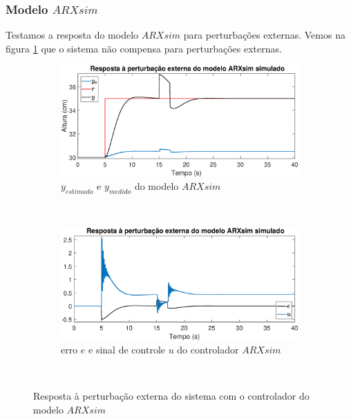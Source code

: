 \subsubsection{Modelo $ARXsim$}

Testamos a resposta do modelo $ARXsim$ para perturbações externas. Vemos na figura \ref{fig:pextsarxsimy} que o sistema não compensa para perturbações externas.

\begin{figure}[htb]
	\centering
	\begin{subfigure}[t]{0.48\textwidth}
		\includegraphics[width=1\linewidth]{pasta1_figuras/pextsarxsimy}
		\caption[$y_{estimado}$ e $y_{medido}$ do modelo $ARX2$]{$y_{estimado}$ e $y_{medido}$ do modelo $ARXsim$}
		\label{fig:pextsarxsimy}
	\end{subfigure}
	~ %
	\begin{subfigure}[t]{0.48\textwidth}
		\includegraphics[width=1\linewidth]{pasta1_figuras/pextsarxsime}
		\caption[erro $e$ e sinal de controle $u$ do controlador $ARX2$]{erro $e$ e sinal de controle $u$ do controlador $ARXsim$}
		\label{fig:pextsarxsime}
	\end{subfigure}
	~ %
	
	\caption{Resposta à perturbação externa do sistema com o controlador do modelo $ARXsim$}\label{fig:pextsarxsim}
\end{figure}

